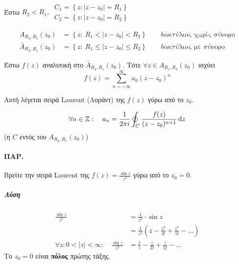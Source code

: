 \documentclass[12pt,a4paper,notitlepage,fleqn]{article}
\begin{document}
  \paragraph{}

  \begin{theorem*}{}
  	Έστω \( R_2 < R_1,\ \begin{array}{l}
  	C_1 = \left\lbrace z:|z-z_0| = R_1 \right\rbrace \\
  	C_2 = \left\lbrace z:|z-z_0| = R_2 \right\rbrace
  	\end{array} \)

  	\begin{align*}
  	A_{R_2,R_1}(z_0) &= \left\lbrace
  	z:\ R_1 < |z-z_0| < R_2
  	 \right\rbrace \qquad \text{δακτύλιος χωρίς σύνορο} \\
  	\bar A_{R_2,R_1}(z_0) &= \left\lbrace
  	z:\ R_1 \leq | z - z_0 | \leq R_2
  	 \right\rbrace \qquad \text{δακτύλιος με σύνορο}
  	\end{align*}


  	Έστω \( f(z) \) αναλυτική στο \( \bar A_{R_2,R_1}(z_0) \). Τότε \( \forall z
  	\in A_{R_1,R_2}(z_0) \) ισχύει \[
  	f(z) = \sum_{n=-\infty}^\infty a_0 (z-z_0)^n
  	\]

  	Αυτή λέγεται σειρά Laurent (Λοράντ) της \( f(z) \) γύρω από το \( z_0 \).

  	\[
  	\forall n \in \mathbb Z: \quad a_n=\frac{1}{2\pi i}\oint_C
  	\frac{f(z)}{(z-z_0)^{n+1}}\mathop{}\!\mathrm{d} z
  	\] (η \( C \) εντός του \( A_{R_2,R_1}(z_0) \))
  \end{theorem*}

  \paragraph{ΠΑΡ.}
  Βρείτε την σειρά Laurent της \( f(z) = \frac{\sin z}{z^2} \) γύρω από το
  \( z_0 = 0 \).
  \subparagraph{Λύση}
  \begin{align*}
  \frac{\sin z}{z^2}&=\frac{1}{z^2}\cdot \sin z
  \\ &= \frac{1}{z^2}\left( z-\frac{z^3}{3!}+\frac{z^5}{5!}-\dots \right)
  \\ \forall z: 0<|z|<\infty: \quad \frac{\sin z}{z^2} &= \frac{1}{z}-\frac{z}{3!}
  +\frac{z}{5!}-\dots
  \end{align*}
  Το \( z_0 = 0 \) είναι \textbf{πόλος} πρώτης τάξης.
\end{document}
